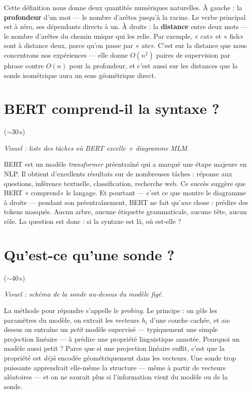 \documentclass[11pt]{article}
\newcommand{\visuel}[1]{%
  {\footnotesize\color{midgray}\textit{Visuel : #1}\par\vspace{0.3em}}}
\newcommand{\duree}[1]{\hfill{\footnotesize\color{midgray}(${\sim}#1$\,s)}}
\begin{document}
Cette définition nous donne deux quantités numériques naturelles. À
gauche : la \textbf{profondeur} d'un mot --- le nombre d'arêtes
jusqu'à la racine. Le verbe principal est à zéro, ses dépendants
directs à un. À droite : la \textbf{distance} entre deux mots --- le
nombre d'arêtes du chemin unique qui les relie. Par exemple,
« cat» et « fish» sont à distance deux, parce qu'on passe
par « ate». C'est sur la distance que nous concentrons nos
expériences --- elle donne $O(n^2)$ paires de supervision par phrase
contre $O(n)$ pour la profondeur, et c'est aussi sur les distances
que la sonde isométrique aura un sens géométrique direct.

\section{BERT comprend-il la syntaxe ?} \duree{30}
\visuel{liste des tâches où BERT excelle + diagramme MLM.}

BERT est un modèle \emph{transformer} préentraîné qui a marqué une
étape majeure en NLP. Il obtient d'excellents résultats sur de
nombreuses tâches : réponse aux questions, inférence textuelle,
classification, recherche web. Ce succès suggère que BERT
« comprend» le langage. Et pourtant --- c'est ce que montre
le diagramme à droite --- pendant son préentraînement, BERT ne fait
qu'\emph{une} chose : prédire des tokens masqués. Aucun arbre, aucune
étiquette grammaticale, aucune tête, aucun rôle. La question est
donc : si la syntaxe est là, où est-elle ?

\section{Qu'est-ce qu'une sonde ?} \duree{40}
\visuel{schéma de la sonde au-dessus du modèle figé.}

La méthode pour répondre s'appelle le \emph{probing}. Le principe :
on gèle les paramètres du modèle, on extrait les vecteurs $h_i$
d'une couche cachée, et au-dessus on entraîne un \emph{petit} modèle
supervisé --- typiquement une simple projection linéaire --- à
prédire une propriété linguistique annotée. Pourquoi un modèle aussi
petit ? Parce que si une projection linéaire suffit, c'est que la
propriété est \emph{déjà} encodée géométriquement dans les vecteurs.
Une sonde trop puissante apprendrait elle-même la structure ---
même à partir de vecteurs aléatoires --- et on ne saurait plus si
l'information vient du modèle ou de la sonde.
\end{document}
